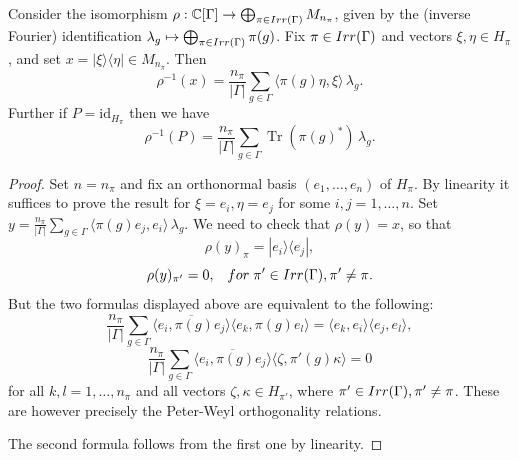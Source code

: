 \documentclass[10pt,a4paper]{amsart}
\DeclareMathOperator{\Tr}{Tr}
\newcommand{\C}{\mathbb{C}}
\newcommand{\id}{\mathrm{id}}
\begin{document}
\begin{lem} \label{PeterWeyl}
Consider the  isomorphism $\rho:\C[\Gamma]\to \bigoplus_{\pi \in \textup{Irr}(\Gamma)} M_{n_{\pi}}$, given by the (inverse Fourier) identification $\lambda_g \mapsto \bigoplus_{\pi \in \textup{Irr}(\Gamma)} \pi(g)$. Fix $\pi \in \textup{Irr}(\Gamma)$ and vectors $\xi,\eta \in H_\pi$, and set $x=|\xi\rangle \langle \eta | \in M_{n_{\pi}}$. Then 
\[ \rho^{-1} (x) = \frac{ n_\pi}{|\Gamma|}\sum_{g\in \Gamma}
\langle \pi(g) \eta,  \xi \rangle\,\lambda_g.\]
Further if $P=\id_{H_\pi}$ then we have
\[ \rho^{-1} (P) = \frac{ n_\pi}{|\Gamma|}\sum_{g\in \Gamma} \Tr(\pi(g)^*) \, \lambda_g.\] 
\end{lem}

\begin{proof}
Set $n=n_\pi$ and fix an orthonormal basis $(e_1, \ldots, e_n)$ of $H_\pi$.
By linearity it suffices to prove the result for $\xi=e_i, \eta = e_j$ for some $i,j=1,\ldots,n$. Set $y=\frac{ n_\pi}{|\Gamma|}\sum_{g\in \Gamma}
\langle \pi(g) e_j,  e_i \rangle\,\lambda_g$. We need to check that $\rho(y) =x$, so that
\[ \rho(y)_\pi = |e_i\rangle \langle e_j|,\]
\[ \rho(y)_{\pi'} =0, \;\;\; \textup{for} \;\pi' \in \textup{Irr}(\Gamma), \pi'\neq \pi.\]
But the two formulas displayed above are equivalent to the following:
\[ \frac{ n_\pi}{|\Gamma|}\sum_{g \in \Gamma}
\overline{ \langle e_i,  \pi(g) e_j \rangle} \langle e_k,  \pi(g) e_l \rangle = \langle e_k, e_i \rangle \langle e_j, e_l \rangle,    \]
\[ \frac{ n_\pi}{|\Gamma|}\sum_{g\in \Gamma}
\overline{ \langle e_i,  \pi(g) e_j \rangle} \langle \zeta,  \pi'(g) \kappa \rangle = 0  \]
for all $k,l=1,\ldots,n_\pi$ and all vectors $\zeta, \kappa \in H_{\pi'}$, where $\pi' \in \textup{Irr}(\Gamma), \pi'\neq \pi$. These are however precisely the Peter-Weyl orthogonality relations.

The second formula follows from the first one by linearity.



\end{proof}
\end{document}
